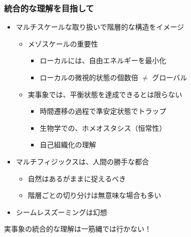 \documentclass[12pt, dvipdfmx]{beamer}
\begin{document}
\begin{frame}
    \frametitle{統合的な理解を目指して}
    \begin{itemize}
        \item マルチスケールな取り扱いで階層的な構造をイメージ
        \begin{itemize}
            \item メゾスケールの重要性
            \begin{itemize}
                \item ローカルには、自由エネルギーを最小化
                \item ローカルの微視的状態の個数倍 $\neq$ グローバル
            \end{itemize}
            \item 実事象では、平衡状態を達成できるとは限らない
            \begin{itemize}
                \item 時間遷移の過程で準安定状態でトラップ
                \item 生物学での、ホメオスタシス（恒常性）
                \item 自己組織化の理解
            \end{itemize}
        \end{itemize}
        \item マルチフィジックスは、人間の勝手な都合
        \begin{itemize}
            \item 自然はあるがままに捉えるべき
            \item 階層ごとの切り分けは無意味な場合も多い
        \end{itemize}
        \item シームレスズーミングは幻想
    \end{itemize}
    \large{\alert{実事象の統合的な理解は一筋縄では行かない！}}
\end{frame}
\end{document}

